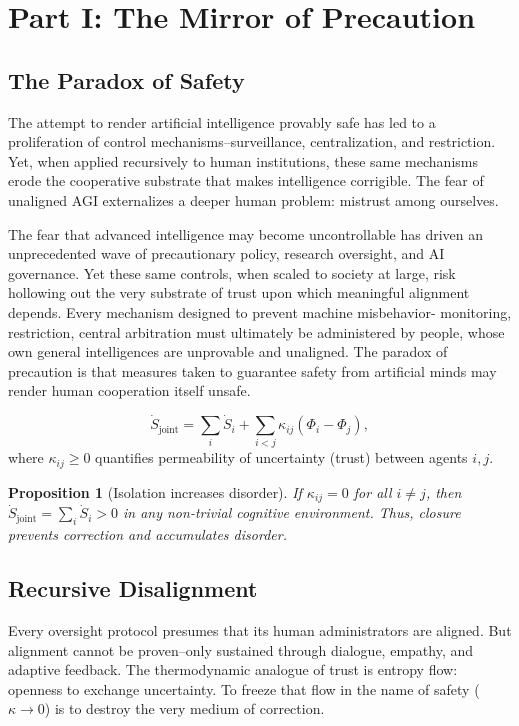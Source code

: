 \documentclass[12pt]{article}
\newtheorem{proposition}{Proposition}
\begin{document}
\section*{Part I: The Mirror of Precaution}

\subsection{The Paradox of Safety}
The attempt to render artificial intelligence provably safe has led to a proliferation of control mechanisms--surveillance, centralization, and restriction. Yet, when applied recursively to human institutions, these same mechanisms erode the cooperative substrate that makes intelligence corrigible. The fear of unaligned AGI externalizes a deeper human problem: mistrust among ourselves.

The fear that advanced intelligence may become uncontrollable has driven an unprecedented wave of precautionary policy, research oversight, and AI governance. Yet these same controls, when scaled to society at large, risk hollowing out the very substrate of trust upon which meaningful alignment depends. Every mechanism designed to prevent machine misbehavior- monitoring, restriction, central arbitration must ultimately be administered by people, whose own general intelligences are unprovable and unaligned. The paradox of precaution is that measures taken to guarantee safety from artificial minds may render human cooperation itself unsafe.

\begin{equation}
\dot S_{\text{joint}} = \sum_{i} \dot S_i + \sum_{i< j} \kappa_{ij}(\Phi_i-\Phi_j),
\end{equation}
where \(\kappa_{ij}\ge 0\) quantifies permeability of uncertainty (trust) between agents \(i,j\).

\begin{proposition}[Isolation increases disorder]
If \(\kappa_{ij}=0\) for all \(i\ne j\), then \(\dot S_{\text{joint}}=\sum_i \dot S_i>0\) in any non-trivial cognitive environment. Thus, closure prevents correction and accumulates disorder.
\end{proposition}

\subsection{Recursive Disalignment}
Every oversight protocol presumes that its human administrators are aligned. But alignment cannot be proven--only sustained through dialogue, empathy, and adaptive feedback. The thermodynamic analogue of trust is entropy flow: openness to exchange uncertainty. To freeze that flow in the name of safety (\(\kappa \to 0\)) is to destroy the very medium of correction.
\end{document}
